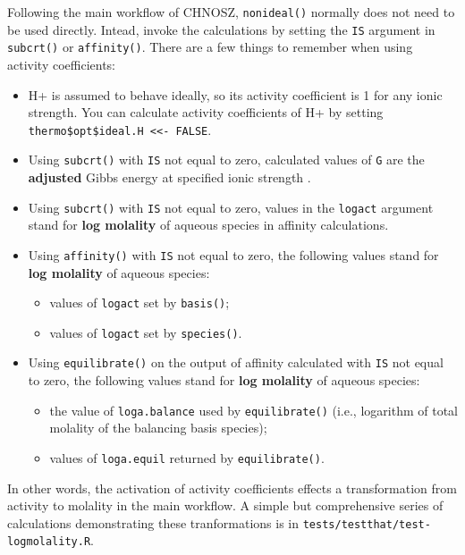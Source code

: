 \documentclass[]{tufte-handout}
\providecommand{\tightlist}{%
  \setlength{\itemsep}{0pt}\setlength{\parskip}{0pt}}
\begin{document}
Following the main workflow of CHNOSZ, {\texttt{nonideal()}} normally
does not need to be used directly. Intead, invoke the calculations by
setting the \texttt{IS} argument in {\texttt{subcrt()}} or
{\texttt{affinity()}}. There are a few things to remember when using
activity coefficients:

\begin{itemize}
\item
  H+ is assumed to behave ideally, so its activity coefficient is 1 for
  any ionic strength. You can calculate activity coefficients of H+ by
  setting \texttt{thermo\$opt\$ideal.H\ \textless{}\textless{}-\ FALSE}.
\item
  Using {\texttt{subcrt()}} with \texttt{IS} not equal to zero,
  calculated values of \texttt{G} are the \textbf{adjusted} Gibbs energy
  at specified ionic strength \citep[denoted by
  Δ\emph{G}Â°(\emph{I});][]{Alb96}.
\item
  Using {\texttt{subcrt()}} with \texttt{IS} not equal to zero, values
  in the \texttt{logact} argument stand for \textbf{log molality} of
  aqueous species in affinity calculations.
\item
  Using {\texttt{affinity()}} with \texttt{IS} not equal to zero, the
  following values stand for \textbf{log molality} of aqueous species:

  \begin{itemize}
  \tightlist
  \item
    values of \texttt{logact} set by {\texttt{basis()}};
  \item
    values of \texttt{logact} set by {\texttt{species()}}.
  \end{itemize}
\item
  Using {\texttt{equilibrate()}} on the output of affinity calculated
  with \texttt{IS} not equal to zero, the following values stand for
  \textbf{log molality} of aqueous species:

  \begin{itemize}
  \tightlist
  \item
    the value of \texttt{loga.balance} used by {\texttt{equilibrate()}}
    (i.e., logarithm of total molality of the balancing basis species);
  \item
    values of \texttt{loga.equil} returned by {\texttt{equilibrate()}}.
  \end{itemize}
\end{itemize}

In other words, the activation of activity coefficients effects a
transformation from activity to molality in the main workflow. A simple
but comprehensive series of calculations demonstrating these
tranformations is in \texttt{tests/testthat/test-logmolality.R}.
\end{document}
